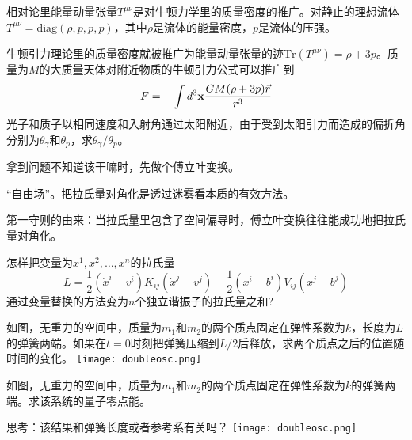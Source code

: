 \documentclass[CJK]{beamer}
\begin{document}
\begin{frame}
\bch
相对论里能量动量张量$T^{\mu\nu}$是对牛顿力学里的质量密度的推广。对静止的理想流体$T^{\mu\nu} = \mathrm{diag}(\rho, p, p, p)$，其中$\rho$是流体的能量密度，$p$是流体的压强。

牛顿引力理论里的质量密度就被推广为能量动量张量的迹$\mathrm{Tr}(T^{\mu\nu}) = \rho + 3p$。质量为$M$的大质量天体对附近物质的牛顿引力公式可以推广到
$$ F = - \int d^3{\mathbf{x}} \frac{GM(\rho + 3p) \vec{r}}{r^3}$$
光子和质子以相同速度和入射角通过太阳附近，由于受到太阳引力而造成的偏折角分别为$\theta_\gamma$和$\theta_p$，求$\theta_\gamma/\theta_p$。

\ech
\end{frame}

\begin{frame}
\bch
拿到问题不知道该干嘛时，先做个傅立叶变换。
\ech
\end{frame}

\begin{frame}
\bch

{“自由场”。把拉氏量对角化是透过迷雾看本质的有效方法。

\skipline
 第一守则的由来：当拉氏量里包含了空间偏导时，傅立叶变换往往能成功地把拉氏量对角化。}

\ech
\end{frame}

\begin{frame}
\bch
怎样把变量为$x^1, x^2,\ldots, x^n$的拉氏量
$$L = \frac{1}{2} (\dot{x}^i-v^i) K_{ij} (\dot{x}^j-v^j) - \frac{1}{2} (x^i-b^i) V_{ij} (x^j - b^j)$$
通过变量替换的方法变为$n$个独立谐振子的拉氏量之和?
\ech
\end{frame}


\begin{frame}
\bch
{}
如图，无重力的空间中，质量为$m_1$和$m_2$的两个质点固定在弹性系数为$k$，长度为$L$的弹簧两端。如果在$t=0$时刻把弹簧压缩到$L/2$后释放，求两个质点之后的位置随时间的变化。
\emini
{}
\texttt{[image: doubleosc.png]}
\emini
\ech
\end{frame}


\begin{frame}
\bch
{}
如图，无重力的空间中，质量为$m_1$和$m_2$的两个质点固定在弹性系数为$k$的弹簧两端。求该系统的量子零点能。

\skipline
思考：该结果和弹簧长度或者参考系有关吗？
\emini
{}
\texttt{[image: doubleosc.png]}
\emini
\ech
\end{frame}
\end{document}
